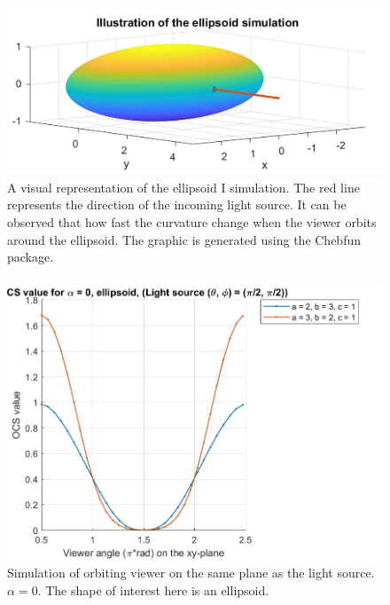 \documentclass[11pt]{amsart}
\theoremstyle{definition}
\begin{document}
\begin{figure}[h]
\includegraphics[scale=0.35]{./figs/OCS_ellipsoid}
\caption{A visual representation of the ellipsoid I simulation. The red line represents the direction of the incoming light source. It can be observed that how fast the curvature change when the viewer orbits around the ellipsoid. The graphic is generated using the Chebfun package.}
\label{OCSEllipsoid}
\end{figure}

\begin{figure}[h]
\includegraphics[scale=0.35]{./figs/OCS_parallel_plane_ellipsoid}
\caption{Simulation of orbiting viewer on the same plane as the light source. $\alpha = 0$. The shape of interest here is an ellipsoid.}
\label{OCSParallelPlaneEllipsoid}
\end{figure}
\end{document}

